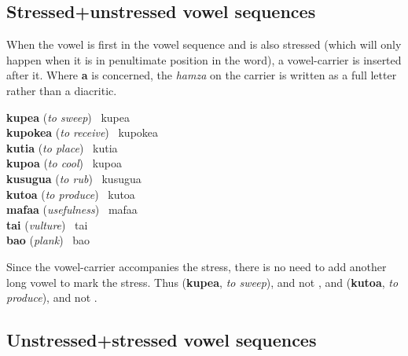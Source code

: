 \subsection{Stressed+unstressed vowel sequences}

When the vowel is first in the vowel sequence and is also stressed (which will only happen when it is in penultimate position in the word), a vowel-carrier is inserted after it.  Where \textbf{a} is concerned, the \textit{hamza} on the carrier is written as a full letter rather than a diacritic.

\hangindent=3cm  %
\textbf{kupea} (\textit{to sweep}) \textrightarrow\ kupea \textrightarrow\  \\
\textbf{kupokea} (\textit{to receive}) \textrightarrow\ kupokea \textrightarrow\  \\
\textbf{kutia} (\textit{to place}) \textrightarrow\ kutia \textrightarrow\  \\
\textbf{kupoa} (\textit{to cool}) \textrightarrow\ kupoa \textrightarrow\  \\
\textbf{kusugua} (\textit{to rub}) \textrightarrow\ kusugua \textrightarrow\  \\
\textbf{kutoa} (\textit{to produce}) \textrightarrow\ kutoa \textrightarrow\  \\
\textbf{mafaa} (\textit{usefulness}) \textrightarrow\ mafaa \textrightarrow\  \\
\textbf{tai} (\textit{vulture}) \textrightarrow\ tai \textrightarrow\  \\
\textbf{bao} (\textit{plank}) \textrightarrow\ bao \textrightarrow\ 

Since the vowel-carrier accompanies the stress, there is no need to add another long vowel to mark the stress. Thus  (\textbf{kupea}, \textit{to sweep}), and not , and  (\textbf{kutoa}, \textit{to produce}), and not .

\subsection{Unstressed+stressed vowel sequences}

